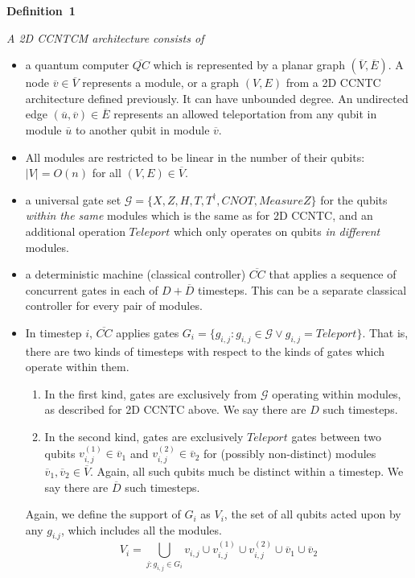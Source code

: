 \documentclass[twoside]{article}
\begin{document}
{\noindent\bf Definition~1} {\it A \textsc{2D CCNTCM} architecture consists of

\begin{itemize}
\item a quantum computer $\overline{QC}$ which is represented by a planar graph $(\overline{V},\overline{E})$. A
node $\overline{v} \in \overline{V}$ represents a module, or a graph $(V,E)$
from a \textsc{2D CCNTC} architecture defined previously. It can have
unbounded degree.
An
undirected edge $(\overline{u},\overline{v}) \in \overline{E}$ represents an
allowed teleportation from any qubit in module $\overline{u}$ to
another qubit in module $\overline{v}$.
\item All modules are restricted to be linear in the number of their qubits:
$|V| = O(n)$ for all $(V,E) \in \overline{V}$.
\item a universal gate set $\mathcal{G} = \{X, Z, H, T, T^{\dagger}, CNOT,
MeasureZ\}$
for the qubits \emph{within the same} modules which is the same as for \textsc{2D CCNTC},
and an additional operation $Teleport$ which only operates on qubits
\emph{in
different} modules.
\item a deterministic machine (classical controller) $\overline{CC}$ that applies a sequence
of concurrent gates in each of $D+\overline{D}$ timesteps.
This can be a separate classical controller
for every pair of modules.
\item In timestep $i$, $\overline{CC}$ applies
gates $G_i = \{g_{i,j} : g_{i,j} \in \mathcal{G} \lor g_{i,j} = Teleport \}$.
That is, there are two kinds of timesteps with respect to the kinds of gates
which operate within them.
\begin{enumerate}
\item In the first kind, gates are exclusively from $\mathcal{G}$ operating within modules, as described
for \textsc{2D CCNTC} above. We say there are $D$ such timesteps.
\item In the second kind, gates are exclusively $Teleport$ gates between two qubits $v^{(1)}_{i,j} \in \overline{v}_1$ and
$v^{(2)}_{i,j} \in \overline{v}_2$ for
(possibly non-distinct) modules $\overline{v}_1, \overline{v}_2 \in \overline{V}$.
Again, all such qubits much be distinct within a timestep.
We say there are $\overline{D}$ such timesteps.
\end{enumerate}

Again, we define the support of $G_i$
as $V_i$, the set of all qubits acted upon by any $g_{i.j}$, which
includes all the modules.
\begin{equation}
V_i = \bigcup_{j: g_{i,j} \in G_i} v_{i,j} \cup v^{(1)}_{i,j} \cup v^{(2)}_{i,j} \cup \overline{v}_1 \cup \overline{v}_2
\end{equation}

\end{itemize}
} %
\end{document}
